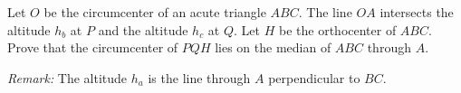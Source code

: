 Let $O$ be the circumcenter of an acute triangle $ABC$.
The line $OA$ intersects the altitude $h_b$ at $P$ and the altitude $h_c$ at $Q$.
Let $H$ be the orthocenter of $ABC$.
Prove that the circumcenter of $PQH$ lies on the median of $ABC$ through $A$.

\emph{Remark:} The altitude $h_a$ is the line through $A$ perpendicular to $BC$.
